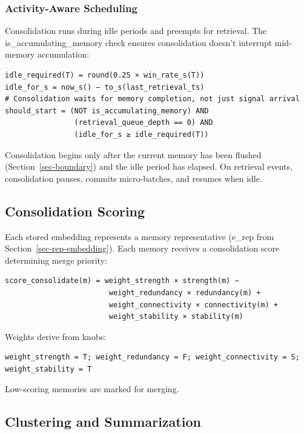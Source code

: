 \documentclass[
  letterpaper,
  DIV=11,
  numbers=noendperiod]{scrartcl}
\begin{document}
\subsubsection{Activity-Aware Scheduling}\label{sec-activity}

Consolidation runs during idle periods and preempts for retrieval. The
is\_accumulating\_memory check ensures consolidation doesn't interrupt
mid-memory accumulation:

\begin{verbatim}
idle_required(T) = round(0.25 × win_rate_s(T))
idle_for_s = now_s() − to_s(last_retrieval_ts)
# Consolidation waits for memory completion, not just signal arrival
should_start = (NOT is_accumulating_memory) AND
                (retrieval_queue_depth == 0) AND
                (idle_for_s ≥ idle_required(T))
\end{verbatim}

Consolidation begins only after the current memory has been flushed
(Section~\ref{sec-boundary}) and the idle period has elapsed. On
retrieval events, consolidation pauses, commits micro-batches, and
resumes when idle.

\subsection{Consolidation Scoring}\label{consolidation-scoring}

Each stored embedding represents a memory representative (e\_rep from
Section~\ref{sec-rep-embedding}). Each memory receives a consolidation
score determining merge priority:

\begin{verbatim}
score_consolidate(m) = weight_strength × strength(m) −
                        weight_redundancy × redundancy(m) +
                        weight_connectivity × connectivity(m) +
                        weight_stability × stability(m)
\end{verbatim}

Weights derive from knobs:

\begin{verbatim}
weight_strength = T; weight_redundancy = F; weight_connectivity = S; weight_stability = T
\end{verbatim}

Low-scoring memories are marked for merging.

\subsection{Clustering and
Summarization}\label{clustering-and-summarization}
\end{document}
